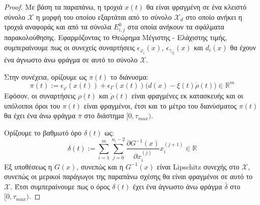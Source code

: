 \begin{proof}
Με βάση τα παραπάνω, η τροχιά $x(t)$ θα είναι φραγμένη σε ένα κλειστό σύνολο $\mathcal{X}$ η μορφή του οποίου εξαρτάται από το σύνολο $\mathcal{X}_d$ στο οποίο ανήκει η τροχιά αναφοράς και από τα σύνολα $E_{i,j}^0$ στα οποία ανήκουν τα σφάλματα παρακολούθησης. Εφαρμόζοντας το Θεώρημα Μέγιστης - 
Ελάχιστης τιμής, συμπεραίνουμε πως οι συνεχείς συναρτήσεις $\epsilon_{\varphi_i}(x)$, $\epsilon_{\gamma_{ij}}(x)$ και $d_i(x)$ θα έχουν ένα άγνωστο άνω φράγμα 
σε αυτό το σύνολο $\mathcal{X}$.

Στην συνέχεια, ορίζουμε ως $\pi(t)$ το διάνυσμα:
\begin{equation}
	\pi(t) := \epsilon_{\varphi}(x(t) )  
	+  \epsilon_{\Gamma}(x(t)) \big( d(x) - \xi(t)\dot{\rho}(t) \big)
	\in \mathbb{R}^m
	\label{eq:pi_definition}
\end{equation}
Εφόσον, οι συναρτήσεις $\rho(t)$ και $\dot{\rho}(t)$ είναι φραγμένες εκ κατασκευής και οι υπόλοιποι όροι του $\pi(t)$ είναι φραγμένοι, έτσι και το μέτρο του διανύσματος $\pi(t)$ θα έχει ένα άνω φράγμα $\bar{\pi}$ στο διάστημα $[0, \tau_{max})$.

Ορίζουμε το βαθμωτό όρο $\delta(t)$ ως:
\begin{equation}
	\delta(t) := \sum_{i=1}^{m} \sum_{j=0}^{n_i - 2} 
	\frac{\partial G^{-1}(x) }{\partial x_i^{(j)}} x_i^{(j +1)} \in \mathbb{R}
	\label{eq:delta_definition}
\end{equation}
Εξ υποθέσεως η $G(x)$, συνεπώς και η $G^{-1}(x)$ είναι Lipschitz συνεχής στο $\mathcal{X}$, συνεπώς οι μερικοί παράγωγοι της παραπάνω σχέσης θα είναι φραγμένοι σε αυτό το $\mathcal{X}$. Έτσι συμπεραίνουμε πως ο όρος $\delta(t)$ έχει ένα άγνωστο άνω φράγμα $\bar{\delta}$ στο $[0,\tau_{max})$.


\end{proof}
